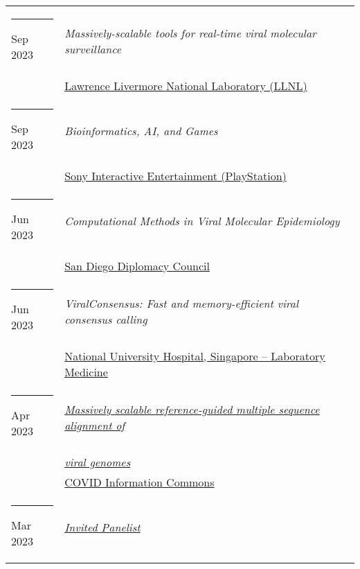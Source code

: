 \documentclass[margin,line]{res}
\begin{document}
\begin{resume}
\begin{longtable}{@{}p{0.7in}p{4in}}
\hspace*{-4mm} \rule{-1mm}{5mm} Sep 2023 & \textit{Massively-scalable tools for real-time viral molecular surveillance}\\*
\hspace*{-4mm} & \hspace{4mm} \href{https://llnl.gov/}{Lawrence Livermore National Laboratory (LLNL)}\\
\hspace*{-4mm} \rule{-1mm}{5mm} Sep 2023 & \textit{Bioinformatics, AI, and Games}\\*
\hspace*{-4mm} & \hspace{4mm} \href{https://sonyinteractive.com/}{Sony Interactive Entertainment (PlayStation)}\\
\hspace*{-4mm} \rule{-1mm}{5mm} Jun 2023 & \textit{Computational Methods in Viral Molecular Epidemiology}\\*
\hspace*{-4mm} & \hspace{4mm} \href{https://sandiegodiplomacy.org/}{San Diego Diplomacy Council}\\
\hspace*{-4mm} \rule{-1mm}{5mm} Jun 2023 & \textit{ViralConsensus: Fast and memory-efficient viral consensus calling}\\*
\hspace*{-4mm} & \hspace{4mm} \href{https://www.nuh.com.sg/our-services/Specialties/Laboratory-Medicine/Pages/default.aspx}{National University Hospital, Singapore -- Laboratory Medicine}\\
\hspace*{-4mm} \rule{-1mm}{5mm} Apr 2023 & \href{https://doi.org/10.7916/kdj9-2t95}{\textit{Massively scalable reference-guided multiple sequence alignment of}}\\*
\hspace*{-4mm} & \hspace{4mm} \href{https://doi.org/10.7916/kdj9-2t95}{\textit{viral genomes}}\\*
\hspace*{-4mm} & \hspace{4mm} \href{https://covidinfocommons.datascience.columbia.edu/}{COVID Information Commons}\\
\hspace*{-4mm} \rule{-1mm}{5mm} Mar 2023 & \href{https://teaching.ucr.edu/deck/2023/03/09/exploring-hyflex-perspectives-through-research-and-practice-panel-discussion}{\textit{Invited Panelist}}\\*

\end{longtable}
\end{resume}
\end{document}
